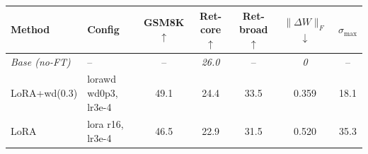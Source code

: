 \begin{tabular}{l l c c c c c}
\toprule
Method & Config & GSM8K $\uparrow$ & Ret-core $\uparrow$ & Ret-broad $\uparrow$ & $\|\Delta W\|_F$ $\downarrow$ & $\sigma_{\max}$ \\
\midrule
\textit{Base (no-FT)} & -- & -- & \textit{26.0} & -- & \textit{0} & -- \\
\midrule
LoRA+wd(0.3) & lorawd wd0p3, lr3e-4 & 49.1 & 24.4 & 33.5 & 0.359 & 18.1 \\
LoRA & lora r16, lr3e-4 & 46.5 & 22.9 & 31.5 & 0.520 & 35.3 \\
\bottomrule
\end{tabular}
